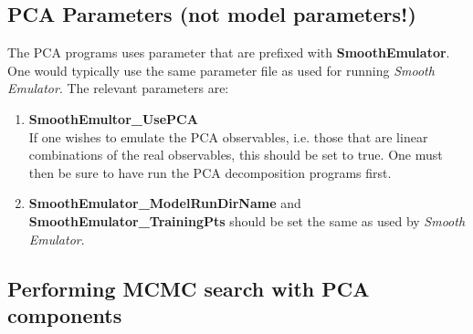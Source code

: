 \documentclass[UserManual.tex]{subfiles}
\begin{document}
\subsection{PCA Parameters (not model parameters!)}
The PCA programs uses parameter that are prefixed with {\bf SmoothEmulator}. One would typically use the same parameter file as used for running {\it Smooth Emulator}. The relevant parameters are:
\begin{enumerate}\itemsep=0pt
\item {\bf SmoothEmultor\_UsePCA}\\
If one wishes to emulate the PCA observables, i.e. those that are linear combinations of the real observables, this should be set to true. One must then be sure to have run the PCA decomposition programs first. 
\item {\bf SmoothEmulator\_ModelRunDirName} and {\bf SmoothEmulator\_TrainingPts} should be set the same as used by {\it Smooth Emulator}.
\end{enumerate}

\subsection{Performing MCMC search with PCA components}
\end{document}
